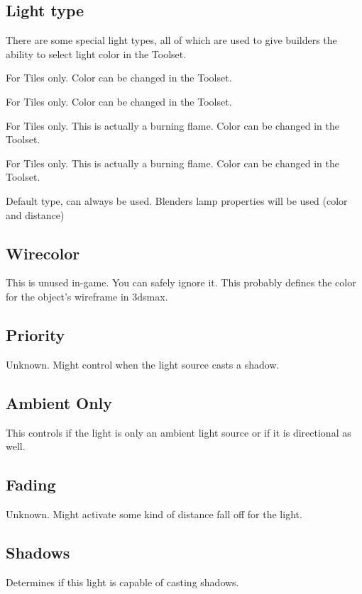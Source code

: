 \subsection*{Light type}
There are some special light types, all of which are used to give builders
the ability to select light color in the Toolset.
\begin{description}[leftmargin=6em,style=nextline]
    \item[Mainlight 1] For Tiles only. Color can be changed in the Toolset.
    \item[Mainlight 2] For Tiles only. Color can be changed in the Toolset.
    \item[Sourcelight 1] For Tiles only. This is actually a burning flame. Color can be changed in the Toolset.
    \item[Sourcelight 2] For Tiles only. This is actually a burning flame. Color can be changed in the Toolset.
    \item[Default] Default type, can always be used. Blenders lamp properties will be used (color and distance)
\end{description}

\subsection*{Wirecolor}
This is unused in-game. You can safely ignore it. This probably defines the
color for the object's wireframe in 3dsmax.

\subsection*{Priority}
Unknown. Might control when the light source casts a shadow.

\subsection*{Ambient Only}
This controls if the light is only an ambient light source or
if it is directional as well.

\subsection*{Fading}
Unknown. Might activate some kind of distance fall off for the light.

\subsection*{Shadows}
Determines if this light is capable of casting shadows.

